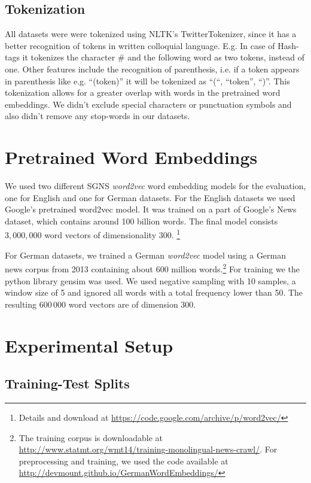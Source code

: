\subsection{Tokenization}

All datasets were were tokenized using NLTK's TwitterTokenizer, since it has a
better recognition of tokens in written colloquial language. E.g. In case of
Hash-tags it tokenizes the character \# and the following word as two tokens, instead of one.
Other features include the recognition of parenthesis, i.e. if a token
appears in parenthesis like e.g. ``(token)'' it will be tokenized as ``(``,
``token'', ``)''. This tokenization allows for a greater overlap with words in the pretrained
word embeddings. We didn't exclude special characters or punctuation symbols and also didn't 
remove any stop-words in our datasets.

\section{Pretrained Word Embeddings}

We used two different SGNS \emph{word2vec} word embedding models for the evaluation, 
one for English and one for German datasets. For the English datasets we used Google's pretrained
word2vec model. It was trained on a part of
Google's News dataset, which contains around 100 billion words. The final model consists $3,000,000$ word vectors of
dimensionality 300. \footnote{Details and download at \url{https://code.google.com/archive/p/word2vec/}}

For German datasets, we trained a German \emph{word2vec} model using a German news
corpus from 2013 containing about 600 million words.\footnote{The training corpus is downloadable at
\url{http://www.statmt.org/wmt14/training-monolingual-news-crawl/}. For preprocessing and training, we used the code available 
at \url{http://devmount.github.io/GermanWordEmbeddings/}} For
training we the python library gensim was used. We used negative sampling with 10 samples, 
a window size of 5 and ignored all words with a total frequency lower than 50.  The
resulting $600\,000$ word vectors are of dimension 300. 

\section{Experimental Setup}

\subsection{Training-Test Splits}

